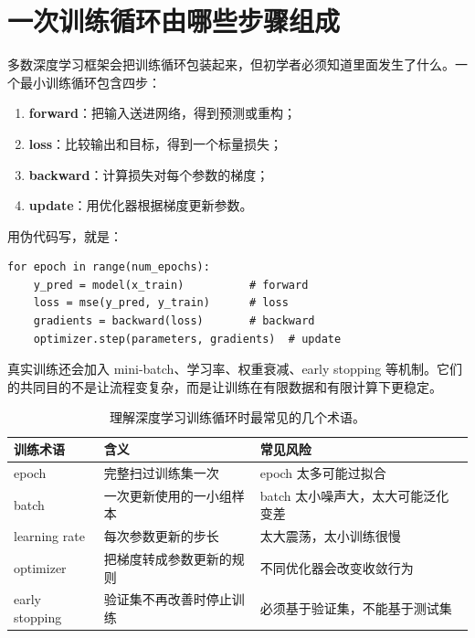 \section{一次训练循环由哪些步骤组成}

多数深度学习框架会把训练循环包装起来，但初学者必须知道里面发生了什么。一个最小训练循环包含四步：

\begin{enumerate}
    \item \textbf{forward}：把输入送进网络，得到预测或重构；
    \item \textbf{loss}：比较输出和目标，得到一个标量损失；
    \item \textbf{backward}：计算损失对每个参数的梯度；
    \item \textbf{update}：用优化器根据梯度更新参数。
\end{enumerate}

用伪代码写，就是：

\begin{examplebox}[最小训练循环]
\begin{lstlisting}[style=pythonstyle]
for epoch in range(num_epochs):
    y_pred = model(x_train)          # forward
    loss = mse(y_pred, y_train)      # loss
    gradients = backward(loss)       # backward
    optimizer.step(parameters, gradients)  # update
\end{lstlisting}
\end{examplebox}

真实训练还会加入 mini-batch、学习率、权重衰减、early stopping 等机制。它们的共同目的不是让流程变复杂，而是让训练在有限数据和有限计算下更稳定。

\begin{table}[htbp]
\centering
\small
\begin{tabular}{>{\raggedright\arraybackslash}p{}>{\raggedright\arraybackslash}p{}>{\raggedright\arraybackslash}p{}}
\toprule
训练术语 & 含义 & 常见风险 \\
\midrule
epoch & 完整扫过训练集一次 & epoch 太多可能过拟合 \\
batch & 一次更新使用的一小组样本 & batch 太小噪声大，太大可能泛化变差 \\
learning rate & 每次参数更新的步长 & 太大震荡，太小训练很慢 \\
optimizer & 把梯度转成参数更新的规则 & 不同优化器会改变收敛行为 \\
early stopping & 验证集不再改善时停止训练 & 必须基于验证集，不能基于测试集 \\
\bottomrule
\end{tabular}
\caption{理解深度学习训练循环时最常见的几个术语。}
\label{tab:ch30_training_loop_terms}
\end{table}


